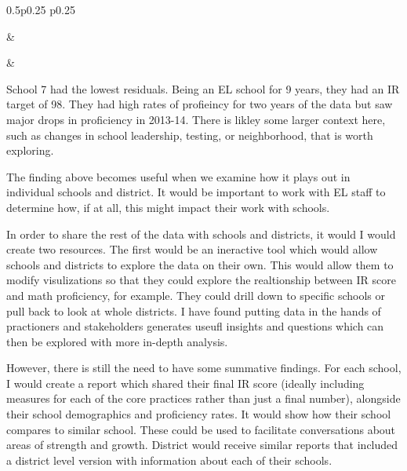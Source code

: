 \documentclass[]{article}
\begin{document}
\begin{table}[h]
\begin{tabularx}{0.5\textwidth}{p{} p{}}
\hhline{}

 &
 \tabularnewline[-0.5pt]


\hhline{}

 &
 \tabularnewline[-0.5pt]


\hhline{}
\end{tabularx}
\end{table}

School 7 had the lowest residuals. Being an EL school for 9 years, they
had an IR target of 98. They had high rates of profieincy for two years
of the data but saw major drops in proficiency in 2013-14. There is
likley some larger context here, such as changes in school leadership,
testing, or neighborhood, that is worth exploring.

The finding above becomes useful when we examine how it plays out in
individual schools and district. It would be important to work with EL
staff to determine how, if at all, this might impact their work with
schools.

In order to share the rest of the data with schools and districts, it
would I would create two resources. The first would be an ineractive
tool which would allow schools and districts to explore the data on
their own. This would allow them to modify visulizations so that they
could explore the realtionship between IR score and math proficiency,
for example. They could drill down to specific schools or pull back to
look at whole districts. I have found putting data in the hands of
practioners and stakeholders generates useufl insights and questions
which can then be explored with more in-depth analysis.

However, there is still the need to have some summative findings. For
each school, I would create a report which shared their final IR score
(ideally including measures for each of the core practices rather than
just a final number), alongside their school demographics and
proficiency rates. It would show how their school compares to similar
school. These could be used to facilitate conversations about areas of
strength and growth. District would receive similar reports that
included a district level version with information about each of their
schools.
\end{document}
